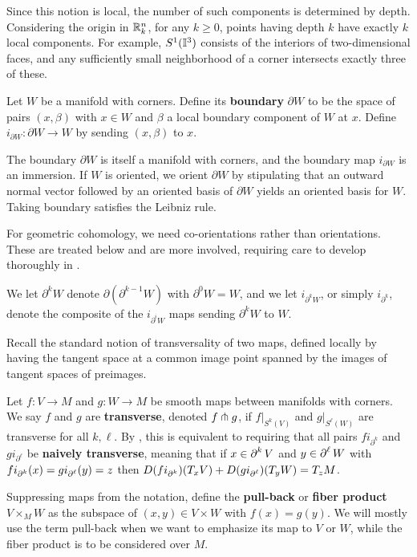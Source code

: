 Since this notion is local, the number of such components is determined by depth.
Considering the origin in $\mathbb{R}^n_k$, for any $k \geq 0$, points having depth $k$ have exactly $k$ local components.
For example, $S^1(\mathbb{I}^3)$ consists of the interiors of two-dimensional faces, and any sufficiently small neighborhood of a corner intersects exactly three of these.

\begin{definition}
	Let $W$ be a manifold with corners.
	Define its {\bf boundary} $\partial W$ to be the space of pairs $(x, \beta)$ with $x \in W$ and $\beta$ a local boundary component of $W$ at $x$.
	Define $i_{\partial W} \colon \partial W \to W$ by sending $(x,\beta)$ to $x$.
\end{definition}

The boundary $\partial W$ is itself a manifold with corners, and the boundary map $i_{\partial W}$ is an immersion.
If $W$ is oriented, we orient $\partial W$ by stipulating that an outward normal vector followed by an oriented basis of $\partial W$ yields an oriented basis for $W$.
Taking boundary satisfies the Leibniz rule.

For geometric cohomology, we need co-orientations rather than orientations.
These are treated below and are more involved, requiring care to develop thoroughly in \cite[Section 3]{medina2022foundations}.

We let $\partial^k W$ denote $\partial (\partial^{k-1} W)$ with $\partial^0 W = W$, and we let $i_{\partial^k W}$, or simply $i_{\partial^k}$, denote the composite of the $i_{\partial^i W}$ maps sending $\partial^k W$ to $W$.

Recall the standard notion of transversality of two maps, defined locally by having the tangent space at a common image point spanned by the images of tangent spaces of preimages.

\begin{definition}
	Let $f \colon V \to M$ and $g \colon W \to M$ be smooth maps between manifolds with corners.
	We say $f$ and $g$ are \textbf{transverse}, denoted $f \pitchfork g$, if $f|_{S^k(V)}$ and $g|_{S^\ell(W)}$ are transverse for all $k, \ell$.
	By \cite[Lemma 2.15]{medina2022foundations}, this is equivalent to requiring that all pairs $fi_{\partial^k}$ and $gi_{\partial^\ell}$ be \textbf{naively transverse}, meaning that if $x \in \operatorname{\partial}^k V$ and $y\in \operatorname{\partial}^\ell W$ with $fi_{\operatorname{\partial}^k}(x) = g i_{\operatorname{\partial}^\ell} (y) = z$ then $D(fi_{\operatorname{\partial}^k})(T_x V)+D(g i_{\operatorname{\partial}^\ell})(T_y W) = T_z M$.

	Suppressing maps from the notation, define the \textbf{pull-back} or \textbf{fiber product} $V \times_M W$ as the subspace of $(x, y) \in V \times W$ with $f(x) = g(y)$.
	We will mostly use the term pull-back when we want to emphasize its map to $V$ or $W$, while the fiber product is to be considered over $M$.
\end{definition}

